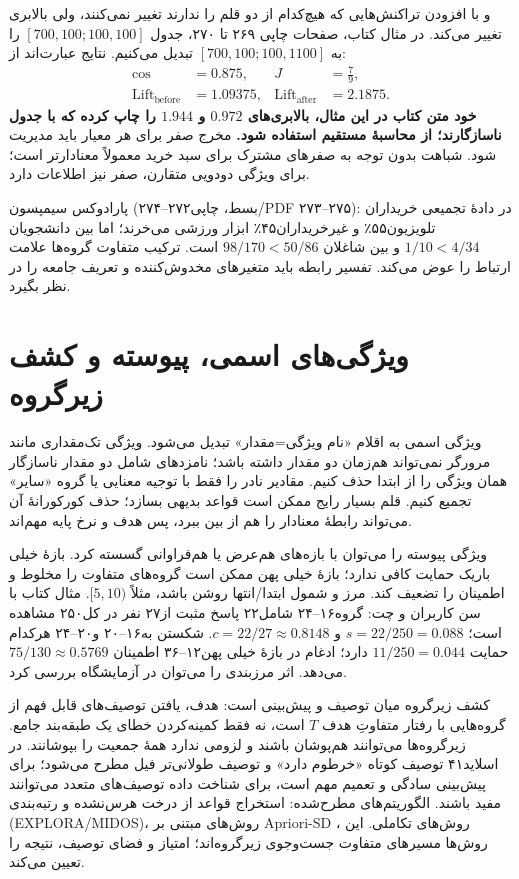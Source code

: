  و  با افزودن تراکنش‌هایی که هیچ‌کدام از دو قلم را ندارند تغییر نمی‌کنند، ولی بالابری تغییر می‌کند. در مثال کتاب، صفحات چاپی ۲۶۹ تا ۲۷۰، جدول $[700,100;100,100]$ را به $[700,100;100,1100]$ تبدیل می‌کنیم. نتایج عبارت‌اند از:
\begin{align*}
\operatorname{cos}&=0.875,& J&=\frac79,\\
\operatorname{Lift}_{\mathrm{before}}&=1.09375,&
\operatorname{Lift}_{\mathrm{after}}&=2.1875.
\end{align*}
\textbf{خود متن کتاب در این مثال، بالابری‌های $0.972$ و $1.944$ را چاپ کرده که با جدول ناسازگارند؛ از محاسبهٔ مستقیم استفاده شود.} مخرج صفر برای هر معیار باید مدیریت شود. شباهت بدون توجه به صفرهای مشترک برای سبد خرید معمولاً معنادارتر است؛ برای ویژگی دودویی متقارن، صفر نیز اطلاعات دارد.

پارادوکس سیمپسون (بسط، چاپی۲۷۲--۲۷۴/PDF ۲۷۳--۲۷۵): در دادهٔ تجمیعی خریداران تلویزیون۵۵٪ و غیرخریداران۴۵٪ ابزار ورزشی می‌خرند؛ اما بین دانشجویان $1/10<4/34$ و بین شاغلان $98/170<50/86$ است. ترکیب متفاوت گروه‌ها علامت ارتباط را عوض می‌کند. تفسیر رابطه باید متغیرهای مخدوش‌کننده و تعریف جامعه را در نظر بگیرد.

\section{ویژگی‌های اسمی، پیوسته و کشف زیرگروه}

ویژگی اسمی به اقلام «نام ویژگی=مقدار» تبدیل می‌شود. ویژگی تک‌مقداری مانند مرورگر نمی‌تواند هم‌زمان دو مقدار داشته باشد؛ نامزدهای شامل دو مقدار ناسازگار همان ویژگی را از ابتدا حذف کنیم. مقادیر نادر را فقط با توجیه معنایی یا گروه «سایر» تجمیع کنیم. قلم بسیار رایج ممکن است قواعد بدیهی بسازد؛ حذف کورکورانهٔ آن می‌تواند رابطهٔ معنادار را هم از بین ببرد، پس هدف و نرخ پایه مهم‌اند.

ویژگی پیوسته را می‌توان با بازه‌های هم‌عرض یا هم‌فراوانی گسسته کرد. بازهٔ خیلی باریک حمایت کافی ندارد؛ بازهٔ خیلی پهن ممکن است گروه‌های متفاوت را مخلوط و اطمینان را تضعیف کند. مرز و شمول ابتدا/انتها روشن باشد، مثلاً $[5,10)$. مثال کتاب با سن کاربران و چت: گروه۱۶--۲۴ شامل۲۲ پاسخ مثبت از۲۷ نفر در کل۲۵۰ مشاهده است؛ $s=22/250=0.088$ و $c=22/27\approx0.8148$. شکستن به۱۶--۲۰ و۲۰--۲۴ هرکدام حمایت $11/250=0.044$ دارد؛ ادغام در بازهٔ خیلی پهن۱۲--۳۶ اطمینان $75/130\approx0.5769$ می‌دهد. اثر مرزبندی را می‌توان در آزمایشگاه بررسی کرد.

کشف زیرگروه میان توصیف و پیش‌بینی است: هدف، یافتن توصیف‌های قابل فهم از گروه‌هایی با رفتار متفاوتِ هدف $T$ است، نه فقط کمینه‌کردن خطای یک طبقه‌بند جامع. زیرگروه‌ها می‌توانند هم‌پوشان باشند و لزومی ندارد همهٔ جمعیت را بپوشانند. در اسلاید۴۱ توصیف کوتاه «خرطوم دارد» و توصیف طولانی‌تر فیل مطرح می‌شود؛ برای پیش‌بینی سادگی و تعمیم مهم است، برای شناخت داده توصیف‌های متعدد می‌توانند مفید باشند. الگوریتم‌های مطرح‌شده: استخراج قواعد از درخت هرس‌نشده و رتبه‌بندی (EXPLORA/MIDOS)، روش‌های مبتنی بر Apriori-SD ، روش‌های تکاملی. این روش‌ها مسیرهای متفاوت جست‌وجوی زیرگروه‌اند؛ امتیاز و فضای توصیف، نتیجه را تعیین می‌کند.

